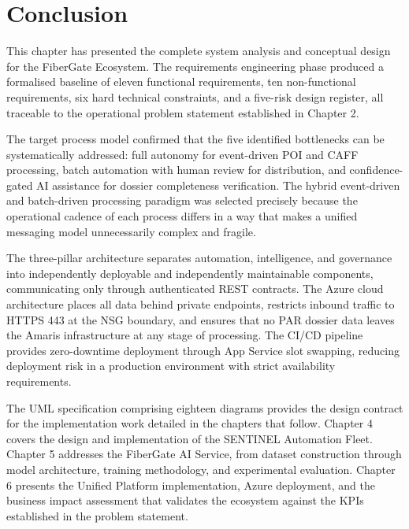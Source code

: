 \section*{Conclusion}

This chapter has presented the complete system analysis and conceptual design for the FiberGate Ecosystem. The requirements engineering phase produced a formalised baseline of eleven functional requirements, ten non-functional requirements, six hard technical constraints, and a five-risk design register, all traceable to the operational problem statement established in Chapter 2.

The target process model confirmed that the five identified bottlenecks can be systematically addressed: full autonomy for event-driven POI and CAFF processing, batch automation with human review for distribution, and confidence-gated AI assistance for dossier completeness verification. The hybrid event-driven and batch-driven processing paradigm was selected precisely because the operational cadence of each process differs in a way that makes a unified messaging model unnecessarily complex and fragile.

The three-pillar architecture separates automation, intelligence, and governance into independently deployable and independently maintainable components, communicating only through authenticated REST contracts. The Azure cloud architecture places all data behind private endpoints, restricts inbound traffic to HTTPS 443 at the NSG boundary, and ensures that no PAR dossier data leaves the Amaris infrastructure at any stage of processing. The CI/CD pipeline provides zero-downtime deployment through App Service slot swapping, reducing deployment risk in a production environment with strict availability requirements.

The UML specification comprising eighteen diagrams provides the design contract for the implementation work detailed in the chapters that follow. Chapter 4 covers the design and implementation of the SENTINEL Automation Fleet. Chapter 5 addresses the FiberGate AI Service, from dataset construction through model architecture, training methodology, and experimental evaluation. Chapter 6 presents the Unified Platform implementation, Azure deployment, and the business impact assessment that validates the ecosystem against the KPIs established in the problem statement.

